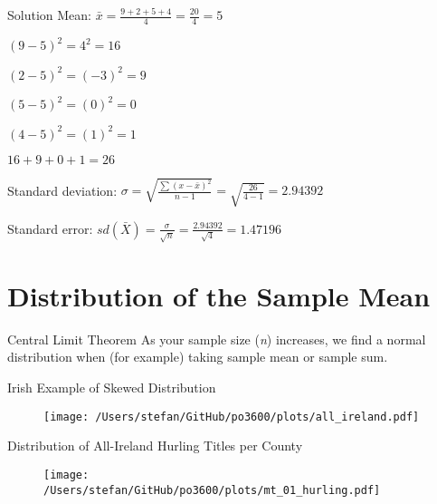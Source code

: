 \documentclass[10pt]{beamer}
\begin{document}
\begin{frame}{Solution}
Mean: $\bar{x}=\frac{9 + 2 + 5 + 4}{4} = \frac{20}{4}=5$


$(9 - 5)^{2} = 4^{2} = 16$

$(2 - 5)^{2} = (-3)^{2} = 9$

$(5 - 5)^{2} = (0)^{2} = 0$

$(4 - 5)^{2} = (1)^{2} = 1$


$16 + 9 +  0 + 1 = 26$


Standard deviation: $\sigma=\sqrt{\frac{\sum(x-\bar{x})^{2}}{n-1}} = \sqrt{\frac{26}{4-1}}= 2.94392$

Standard error:  $sd(\bar{X})=\frac{\sigma}{\sqrt{n}}=\frac{2.94392}{\sqrt{4}}=1.47196$

\end{frame}

\section{Distribution of the Sample Mean}


\begin{frame}{Central Limit Theorem}
As your sample size (\textit{n}) increases, we find a normal distribution when (for example) taking sample mean or sample sum.

\end{frame}

\begin{frame}{Irish Example of Skewed Distribution}
\begin{figure} \centering
\texttt{[image: /Users/stefan/GitHub/po3600/plots/all\_ireland.pdf]}
\end{figure}
\end{frame}

\begin{frame}{Distribution of All-Ireland Hurling Titles per County}

\begin{figure} \centering
\texttt{[image: /Users/stefan/GitHub/po3600/plots/mt\_01\_hurling.pdf]}
\end{figure}
\end{frame}
\end{document}
